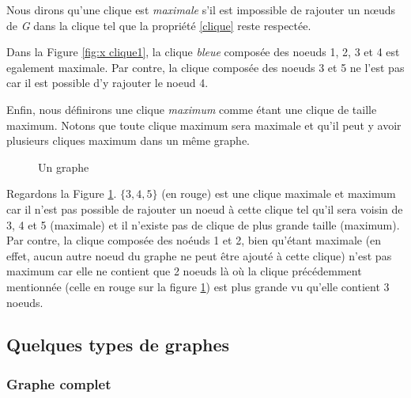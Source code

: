 \documentclass[12pt,a4paper]{article}
\begin{document}
Nous dirons qu'une clique est \textit{maximale} s'il est impossible de rajouter un nœuds de \emph{G} dans la clique tel que la propriété \eqref{clique} reste respectée.

Dans la Figure \ref{fig:x clique1}, la clique \textit{bleue} composée des noeuds 1, 2, 3 et 4 est egalement maximale. Par contre, la clique composée des noeuds 3 et 5 ne l'est pas car il est possible d'y rajouter le noeud 4.

Enfin, nous définirons une clique \textit{maximum} comme étant une clique de taille maximum. Notons que toute clique maximum sera maximale et qu'il peut y avoir plusieurs cliques maximum dans un même graphe.

\begin{figure}[h]
  \begin{center}
\caption{Un graphe}
  \label{fig:x clique2}
\end{center}
\end{figure}

Regardons la Figure \ref{fig:x clique2}. $ \{3, 4, 5\}$ (en rouge) est une clique maximale et maximum car il n'est pas possible de rajouter un noeud à cette clique tel qu'il sera voisin de 3, 4 et 5 (maximale) et il n'existe pas de clique de plus grande taille (maximum). Par contre, la clique composée des noéuds 1 et 2, bien qu'étant maximale (en effet, aucun autre noeud du graphe ne peut être ajouté à cette clique) n'est pas maximum car elle ne contient que 2 noeuds là où la clique précédemment mentionnée (celle en rouge sur la figure \ref{fig:x clique2}) est plus grande vu qu'elle contient 3 noeuds.

\subsection{Quelques types de graphes}%
\label{subsec:graphes}

\subsubsection*{Graphe complet}
\label{subsubsec:complet}
\end{document}
